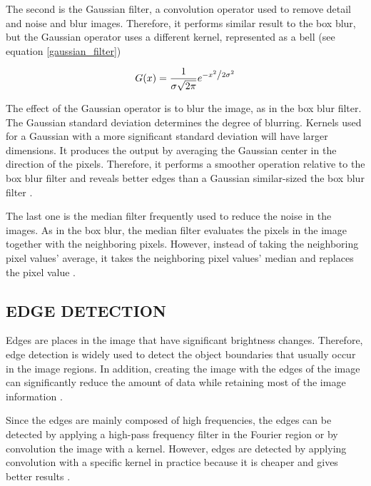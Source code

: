 The second is the Gaussian filter, a convolution operator used to remove detail and noise and blur images. Therefore, it performs similar result to the box blur, but the Gaussian operator uses a different kernel, represented as a bell \cite{getreuer2013survey} (see equation \ref{gaussian_filter})

\begin{equation} \label{gaussian_filter}
G(x) = \frac{1} { {\sigma \sqrt {2\pi } } } 
e^{
    {
        { - {x} ^2 }
        \mathord{\left/ {\vphantom {{ - \left( {x - \mu } \right)^2 } {2\sigma ^2 }}} \right. \kern-\nulldelimiterspace} {2\sigma ^2 }
    }
}
\end{equation}

The effect of the Gaussian operator is to blur the image, as in the box blur filter. The Gaussian standard deviation determines the degree of blurring. Kernels used for a Gaussian with a more significant standard deviation will have larger dimensions. It produces the output by averaging the Gaussian center in the direction of the pixels. Therefore, it performs a smoother operation relative to the box blur filter and reveals better edges than a Gaussian similar-sized the box blur filter \cite{getreuer2013survey}.

The last one is the median filter frequently used to reduce the noise in the images. As in the box blur, the median filter evaluates the pixels in the image together with the neighboring pixels. However, instead of taking the neighboring pixel values' average, it takes the neighboring pixel values' median and replaces the pixel value \cite{russ2010image}.

\subsection{EDGE DETECTION}

Edges are places in the image that have significant brightness changes. Therefore, edge detection is widely used to detect the object boundaries that usually occur in the image regions. In addition, creating the image with the edges of the image can significantly reduce the amount of data while retaining most of the image information \cite{russ2010image}.

Since the edges are mainly composed of high frequencies, the edges can be detected by applying a high-pass frequency filter in the Fourier region or by convolution the image with a kernel. However, edges are detected by applying convolution with a specific kernel in practice because it is cheaper and gives better results \cite{russ2010image}.

